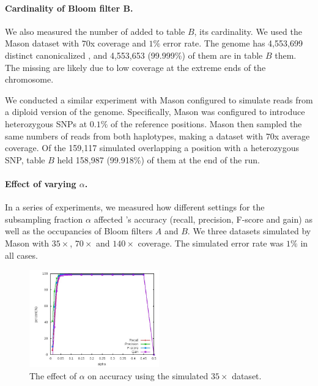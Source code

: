 \documentclass[10pt]{article}
\begin{document}
\paragraph{Cardinality of Bloom filter B.}  We also measured the number of \kmers added to table $B$, \thatis its cardinality. We used the Mason dataset with $70$x coverage and $1\%$ error rate. The \ecoli genome has 4,553,699 distinct canonicalized \kmers, and 4,553,653 (99.999\%) of them are in table $B$ them.  The missing \kmers are likely due to low coverage at the extreme ends of the chromosome.

We conducted a similar experiment with Mason configured to simulate reads from a diploid version of the \ecoli genome.  Specifically, Mason was configured to introduce heterozygous SNPs at $0.1\%$ of the reference positions. Mason then sampled the same numbers of reads from both haplotypes, making a dataset with $70$x average coverage.
Of the 159,117 simulated \kmers overlapping a position with a heterozygous SNP, table $B$ held 158,987 (99.918\%) of them at the end of the run.

\paragraph{Effect of varying $\alpha$.} In a series of experiments, we measured how different settings for the subsampling fraction $\alpha$ affected \tool's accuracy (recall, precision, F-score and gain) as well as the occupancies of Bloom filters $A$ and $B$.  We three datasets simulated by Mason with $35\times$, $70\times$ and $140\times$ coverage.  The simulated error rate was $1\%$ in all cases.


\begin{figure}[h!]
\begin{center}
\includegraphics[width=0.5\textwidth]{alpha.jpg}
\caption{The effect of $\alpha$ on accuracy using the simulated $35\times$ dataset.\label{fig:alpha}}
\end{center}
\end{figure}
\end{document}
